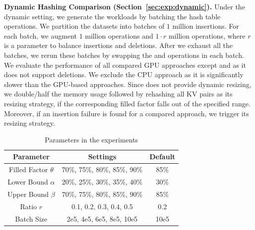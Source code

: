 

\vspace{1mm}\noindent\textbf{Dynamic Hashing Comparison (Section~\ref{sec:exp:dynamic}).}
Under the dynamic setting, we generate the workloads by batching the hash table operations. 
We partition the datasets into batches of $1$ million insertions. 
For each batch, we augment $1$ million  operations and $1 \cdot r$ million  operations,
where $r$ is a parameter to balance insertions and deletions.
After we exhaust all the batches, we rerun these batches by swapping the  and  operations in each batch. 
We evaluate the performance of all compared GPU approaches except \cudpp and \warp as it does not support deletions. 
We exclude the CPU approach as it is significantly slower than the GPU-based approaches. 
Since \megakv does not provide dynamic resizing, we double/half the memory usage followed by rehashing all KV pairs as its resizing strategy, if the corresponding filled factor falls out of the specified range. 
Moreover, if an insertion failure is found for a compared approach, we trigger its resizing strategy.

\begin{table}[t]
	\centering
	\caption{Parameters in the experiments}
	\vspace{-1.5em}
	\label{tbl:parameters}
	\begin{tabular}{|c|c|c|}
		\hline
		\textbf{Parameter} & \textbf{Settings} & \textbf{Default} \\ \hline
		Filled Factor	$\theta$  & 70\%, 75\%, 80\%, 85\%, 90\% & 85\% \\ \hline
		Lower Bound $\alpha$ & 20\%, 25\%, 30\%, 35\%, 40\% & 30\% \\ \hline
		Upper Bound	$\beta$  & 70\%, 75\%, 80\%, 85\%, 90\% & 85\% \\ \hline
		Ratio $r$ & 0.1, 0.2, 0.3, 0.4, 0.5 & 0.2 \\ \hline
		Batch Size & 2e5, 4e5, 6e5, 8e5, 10e5 & 10e5 \\ \hline
	\end{tabular}
\end{table}

